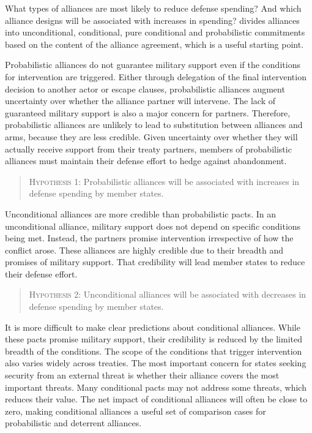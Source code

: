 \documentclass[12pt]{article}
\begin{document}
What types of alliances are most likely to reduce defense spending? And which alliance designs will be associated with increases in spending? \citet{Benson2011, Benson2012} divides alliances into unconditional, conditional, pure conditional and probabilistic commitments based on the content of the alliance agreement, which is a useful starting point. 

Probabilistic alliances do not guarantee military support even if the conditions for intervention are triggered. Either through delegation of the final intervention decision to another actor or escape clauses, probabilistic alliances augment uncertainty over whether the alliance partner will intervene. The lack of guaranteed military support is also a major concern for partners. Therefore, probabilistic alliances are unlikely to lead to substitution between alliances and arms, because they are less credible. Given uncertainty over whether they will actually receive support from their treaty partners, members of probabilistic alliances must maintain their defense effort to hedge against abandonment. 

\begin{quote}
\textsc{Hypothesis 1}: Probabilistic alliances will be associated with increases in defense spending by member states. 
\end{quote}

Unconditional alliances are more credible than probabilistic pacts. In an unconditional alliance, military support does not depend on specific conditions being met. Instead, the partners promise intervention irrespective of how the conflict arose. These alliances are highly credible due to their breadth and promises of military support. That credibility will lead member states to reduce their defense effort. 

\begin{quote}
\textsc{Hypothesis 2}: Unconditional alliances will be associated with decreases in defense spending by member states. 
\end{quote} 

It is more difficult to make clear predictions about conditional alliances. While these pacts promise military support, their credibility is reduced by the limited breadth of the conditions. The scope of the conditions that trigger intervention also varies widely across treaties. The most important concern for states seeking security from an external threat is whether their alliance covers the most important threats. Many conditional pacts may not address some threats, which reduces their value. The net impact of conditional alliances will often be close to zero, making conditional alliances a useful set of comparison cases for probabilistic and deterrent alliances. 
\end{document}
